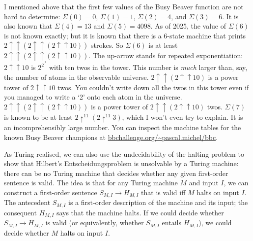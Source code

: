 I mentioned above that the first few values of the Busy Beaver function are not hard to determine:
$\Sigma(0) = 0$, $\Sigma(1) = 1$, $\Sigma(2) = 4$, and $\Sigma(3) = 6$.
It is also known that $\Sigma(4)=13$ and $\Sigma(5)=4098$.
As of 2025,
the value of $\Sigma(6)$ is not known exactly;
but it is known that
there is a 6-state machine that prints $2 \uparrow\uparrow (2 \uparrow\uparrow (2 \uparrow\uparrow 10))$ strokes.
So $\Sigma(6)$ is at least $2 \uparrow\uparrow (2 \uparrow\uparrow (2 \uparrow\uparrow 10))$.
The up-arrow stands for repeated exponentiation:
$2 \uparrow \uparrow 10$ is $2^{2^{\cdot^{2}}}$ with ten twos in the tower.
This number is \emph{much} larger than, say, the number of atoms in the observable universe.
$2 \uparrow\uparrow (2 \uparrow\uparrow 10)$ is a power tower of $2 \uparrow\uparrow 10$ twos.
You couldn't write down all the twos in this tower even if you
managed to write a `2' onto each atom in the universe.
$2 \uparrow\uparrow (2 \uparrow\uparrow (2 \uparrow\uparrow 10))$ is a power tower of $2 \uparrow\uparrow (2 \uparrow\uparrow 10)$ twos.
$\Sigma(7)$ is known to be at least $2\uparrow^{11}(2\uparrow^{11} 3)$,
which I won't even try to explain.
It is an incomprehensibly large number.
You can inspect the machine tables for the known Busy Beaver champions
at \href{https://bbchallenge.org/~pascal.michel/bbc}{bbchallenge.org/\textasciitilde{}pascal.michel/bbc}.




As Turing realised,
we can also use the undecidability of the halting problem
to show that
Hilbert's Entscheidungsproblem is unsolvable by a Turing machine:
there can be no Turing machine that
decides whether any given first-order sentence is valid.
The idea is that
for any Turing machine $M$ and input $I$,
we can construct a first-order sentence $S_{M,I} \to H_{M,I}$ that is valid iff
$M$ halts on input $I$.
The antecedent $S_{M,I}$ is a first-order description of the machine and its input;
the consequent $H_{M,I}$ says that the machine halts.
If we could decide whether $S_{M,I} \to H_{M,I}$ is valid
(or equivalently, whether $S_{M,I}$ entails $H_{M,I}$),
we could decide whether $M$ halts on input $I$.

